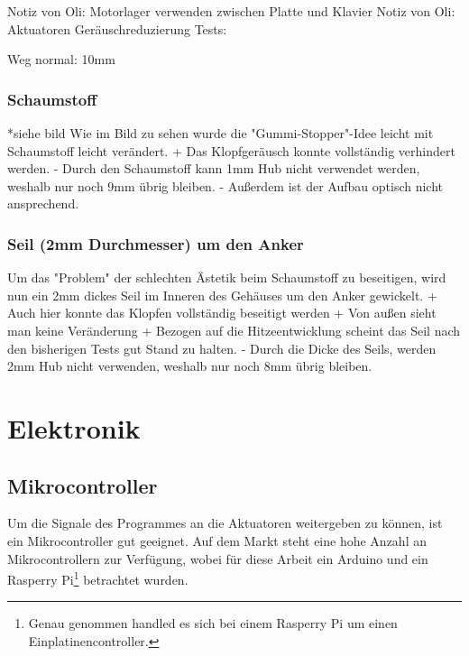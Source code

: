 \begin{enumerate}
Notiz von Oli: Motorlager verwenden zwischen Platte und Klavier
Notiz von Oli:
Aktuatoren Geräuschreduzierung Tests:

Weg normal: 10mm

\subsubsection{Schaumstoff}

*siehe bild
Wie im Bild zu sehen wurde die "Gummi-Stopper"-Idee leicht mit Schaumstoff leicht verändert.
+ Das Klopfgeräusch konnte vollständig verhindert werden.
- Durch den Schaumstoff kann 1mm Hub nicht verwendet werden, weshalb nur noch 9mm übrig bleiben.
- Außerdem ist der Aufbau optisch nicht ansprechend.


\subsubsection{Seil (2mm Durchmesser) um den Anker}

Um das "Problem" der schlechten Ästetik beim Schaumstoff zu beseitigen, wird nun ein 2mm dickes Seil im Inneren des Gehäuses um den Anker gewickelt. \newline
+ Auch hier konnte das Klopfen vollständig beseitigt werden \newline
+ Von außen sieht man keine Veränderung \newline
+ Bezogen auf die Hitzeentwicklung scheint das Seil nach den bisherigen Tests gut Stand zu halten. \newline
- Durch die Dicke des Seils, werden 2mm Hub nicht verwenden, weshalb nur noch 8mm übrig bleiben.


\section{Elektronik}\label{Vorgehen - Hardware}


\subsection{Mikrocontroller}\label{Ansteuerung}
Um die Signale des Programmes an die Aktuatoren weitergeben zu können, ist ein Mikrocontroller gut geeignet.
Auf dem Markt steht eine hohe Anzahl an Mikrocontrollern zur Verfügung, wobei für diese Arbeit ein Arduino und ein Rasperry Pi\footnote{Genau genommen handled es sich bei einem Rasperry Pi um einen Einplatinencontroller.} betrachtet wurden.

\begin{minipage}{0.7\textwidth}

\end{minipage}
\end{enumerate}

